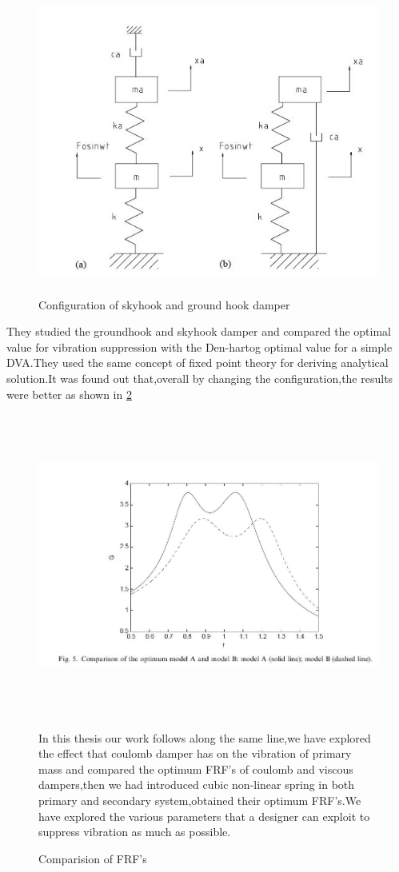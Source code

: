 \begin{figure}[h!]
\includegraphics[width=16cm,height=10cm]{"figures/8"}
\caption{Configuration of skyhook and ground hook damper}
  \label{fig:8}
\end{figure}
They studied the groundhook and skyhook damper and compared the optimal value for vibration suppression with the Den-hartog optimal value for a simple DVA.They used the same concept of fixed point theory for deriving analytical solution.It was found out that,overall by changing the configuration,the results were better as shown in \ref{fig:9}
\begin{figure}[h!]
\includegraphics[width=16cm,height=10cm]{"figures/9"}
\caption{Comparision of FRF's}
  \label{fig:9}
  In this thesis our work follows along the same line,we have explored the effect that coulomb damper has on the vibration of primary mass and compared the optimum FRF's of coulomb and viscous dampers,then we had introduced cubic non-linear spring in both primary and secondary system,obtained their optimum FRF's.We have explored the various parameters that a designer can exploit to suppress vibration as much as possible.
\end{figure}

%